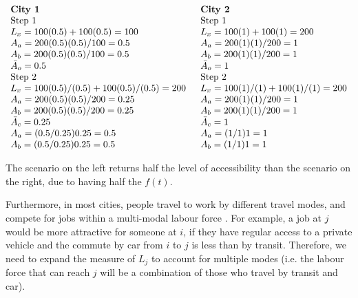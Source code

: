 \documentclass[11 pt, letterpaper]{article}
\begin{document}
{\[
\begin{array}{ll}
\textbf{City 1} & \hspace{2mm} \textbf{City 2} \\
\text{Step 1} & \hspace{2mm} \text{Step 1} \\
L_{x} = 100 (0.5) + 100 (0.5) = 100 & \hspace{2mm} L_{x} = 100 (1) + 100 (1) = 200 \\
A_{a} = 200 (0.5)(0.5) / 100 = 0.5 & \hspace{2mm} A_{a} = 200 (1)(1) / 200 = 1 \\
A_{b} = 200 (0.5)(0.5) / 100 = 0.5 & \hspace{2mm} A_{b} = 200 (1)(1) / 200 = 1 \\
\bar A_o = 0.5 & \hspace{2mm} \bar A_o = 1 \\
\text{Step 2} & \hspace{2mm} \text{Step 2} \\
L_{x} = 100 (0.5) / (0.5) + 100 (0.5) / (0.5) = 200 & \hspace{2mm} L_{x} = 100 (1) / (1) + 100 (1) / (1) = 200 \\
A_{a} = 200 (0.5)(0.5) / 200 = 0.25 & \hspace{2mm} A_{a} = 200 (1)(1) / 200 = 1 \\
A_{b} = 200 (0.5)(0.5) / 200 = 0.25 & \hspace{2mm} A_{b} = 200 (1)(1) / 200 = 1 \\
\bar A_c = 0.25 & \hspace{2mm} \bar A_c = 1 \\
A_{a} = (0.5 / 0.25) 0.25 = 0.5 & \hspace{2mm} A_{a} = (1 / 1) 1 = 1 \\
A_{b} = (0.5 / 0.25) 0.25 = 0.5 & \hspace{2mm} A_{b} = (1 / 1) 1 = 1 \\
\end{array}
\]

The scenario on the left returns half the level of accessibility than the scenario on the right, due to having half the $f(t)$.

Furthermore, in most cities, people travel to work by different travel modes, and compete for jobs within a multi-modal labour force \cite{shen1998,sanchez2004}. For example, a job at $j$ would be more attractive for someone at $i$, if they have regular access to a private vehicle and the commute by car from $i$ to $j$ is less than by transit. Therefore, we need to expand the measure of $L_j$ to account for multiple modes (i.e. the labour force that can reach $j$ will be a combination of those who travel by transit and car).

}
\end{document}
